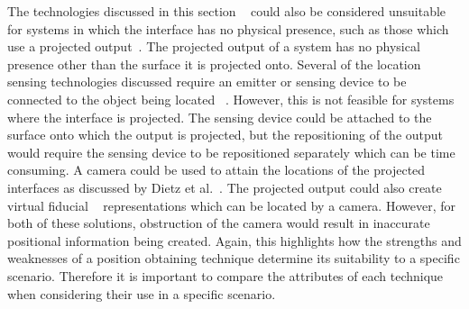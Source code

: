 \documentclass{bmcart}
\begin{document}
The technologies discussed in this section ~\cite{Bose1990,Lee2004,Kortuem2005,Ni2004} could also be considered unsuitable for systems in which the interface has no physical presence, such as those which use a projected output~\cite{Dietz2004,Jones2011}.
The projected output of a system has no physical presence other than the surface it is projected onto.
Several of the location sensing technologies discussed require an emitter or sensing device to be connected to the object being located ~\cite{Lee2004,Kortuem2005,Ni2004}.
However, this is not feasible for systems where the interface is projected.
The sensing device could be attached to the surface onto which the output is projected, but the repositioning of the output would require the sensing device to be repositioned separately which can be time consuming.
A camera could be used to attain the locations of the projected interfaces as discussed by Dietz et al.~\cite{Dietz2004}.
The projected output could also create virtual fiducial ~\cite{Bose1990} representations which can be located by a camera.
However, for both of these solutions, obstruction of the camera would result in inaccurate positional information being created.
Again, this highlights how the strengths and weaknesses of a position obtaining technique determine its suitability to a specific scenario.
Therefore it is important to compare the attributes of each technique when considering their use in a specific scenario.


\end{document}
